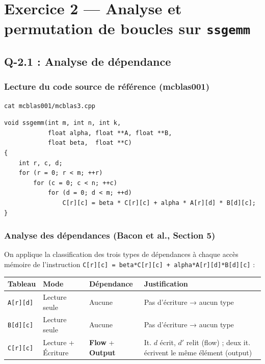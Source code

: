 \documentclass[a4paper,11pt]{article}
\newcommand{\code}[1]{\texttt{\color{CodeRed}#1}}
\begin{document}
\newpage

\section{Exercice 2 --- Analyse et permutation de boucles sur \texttt{ssgemm}}

\subsection{Q-2.1 : Analyse de d\'ependance}

\subsubsection{Lecture du code source de r\'ef\'erence (mcblas001)}

\begin{lstlisting}[style=bash]
cat mcblas001/mcblas3.cpp
\end{lstlisting}

\begin{lstlisting}[style=cpp, caption={mcblas001/mcblas3.cpp --- Version de r\'ef\'erence, ordre r\,$\to$\,c\,$\to$\,d}]
void ssgemm(int m, int n, int k,
            float alpha, float **A, float **B,
            float beta,  float **C)
{
    int r, c, d;
    for (r = 0; r < m; ++r)
        for (c = 0; c < n; ++c)
            for (d = 0; d < m; ++d)
                C[r][c] = beta * C[r][c] + alpha * A[r][d] * B[d][c];
}
\end{lstlisting}

\subsubsection{Analyse des d\'ependances (Bacon et al., Section 5)}

On applique la classification des trois types de d\'ependances \`a chaque acc\`es
m\'emoire de l'instruction \code{C[r][c] = beta*C[r][c] + alpha*A[r][d]*B[d][c]} :

\begin{center}
\begin{tabular}{L{2cm}C{2cm}L{4cm}L{5cm}}
  \toprule
  \textbf{Tableau} & \textbf{Mode} & \textbf{D\'ependance} & \textbf{Justification} \\
  \midrule
  \code{A[r][d]} & Lecture seule  & Aucune & Pas d'\'ecriture → aucun type \\
  \code{B[d][c]} & Lecture seule  & Aucune & Pas d'\'ecriture → aucun type \\
  \code{C[r][c]} & Lecture + \'Ecriture & \textbf{Flow} + \textbf{Output} & It. $d$ \'ecrit, $d'$ relit (flow) ; deux it. \'ecrivent le m\^eme \'el\'ement (output) \\
  \bottomrule
\end{tabular}
\end{center}
\end{document}
